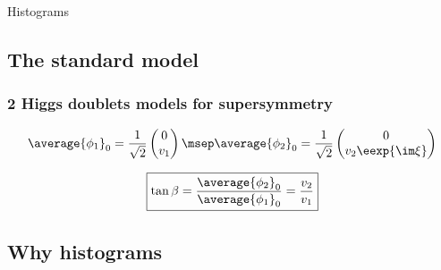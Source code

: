 \def\backupslinklabel#1{\label{backups-#1}}
\def\backupslinkref#1#2{#2~\hyperlink{backups-#1}{\beamerskipbutton{slide~\ref{backups-#1}}}}

\begin{frame}[label=backups]

\backupslinkref{histos}{Histograms}


\end{frame}

\begin{frame}


\end{frame}

\subsection*{The standard model}


\begin{frame}
\frametitle{2 Higgs doublets models for supersymmetry}
\begin{equation*}
\average{\phi_1}_0 = \frac{1}{\sqrt{2}} \begin{pmatrix}
0\\v_1
\end{pmatrix}
\msep
\average{\phi_2}_0 = \frac{1}{\sqrt{2}} \begin{pmatrix}
0\\v_2 \eexp{\im\xi}
\end{pmatrix}
\end{equation*}

\begin{equation*}
\boxed{\tan\beta = \frac{\average{\phi_2}_0}{\average{\phi_1}_0} = \frac{v_2}{v_1}}
\end{equation*}

\end{frame}

\subsection*{Why histograms}




